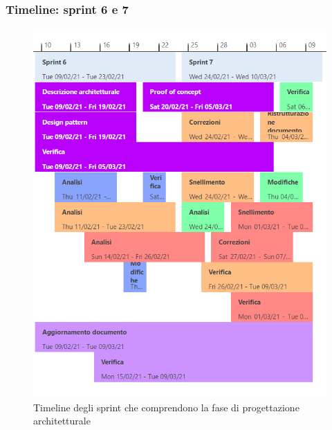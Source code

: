 \subsubsection{Timeline: sprint 6 e 7}
\begin{figure}[H]
    \centering
    \includegraphics[scale = 0.5]{components/img/sprint6-7.png}
    \caption{Timeline degli sprint che comprendono la  fase di progettazione architetturale}
    \label{fig:Timeline,sprint 6 e 7, fase di Progettazione Architetturale}
\end{figure}

